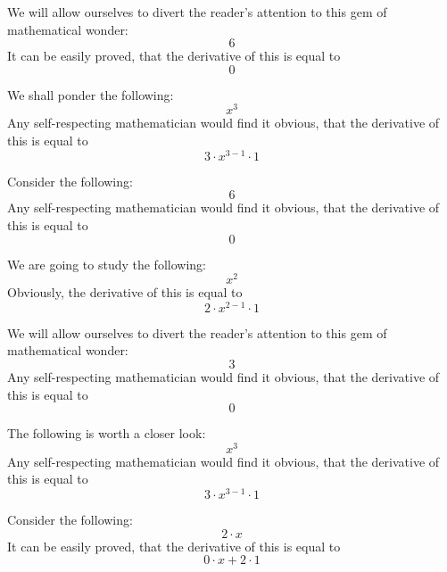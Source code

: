 \documentclass{article}
\begin{document}
We will allow ourselves to divert the reader's attention to this gem of mathematical wonder:
\begin{equation}
6 
\end{equation}
It can be easily proved, that the derivative of this is equal to
\begin{equation}
0 
\end{equation}

We shall ponder the following:
\begin{equation}
x ^{3 } 
\end{equation}
Any self-respecting mathematician would find it obvious, that the derivative of this is equal to
\begin{equation}
3 \cdot x ^{3 - 1 } \cdot 1 
\end{equation}

Consider the following:
\begin{equation}
6 
\end{equation}
Any self-respecting mathematician would find it obvious, that the derivative of this is equal to
\begin{equation}
0 
\end{equation}

We are going to study the following:
\begin{equation}
x ^{2 } 
\end{equation}
Obviously, the derivative of this is equal to
\begin{equation}
2 \cdot x ^{2 - 1 } \cdot 1 
\end{equation}

We will allow ourselves to divert the reader's attention to this gem of mathematical wonder:
\begin{equation}
3 
\end{equation}
Any self-respecting mathematician would find it obvious, that the derivative of this is equal to
\begin{equation}
0 
\end{equation}

The following is worth a closer look:
\begin{equation}
x ^{3 } 
\end{equation}
Any self-respecting mathematician would find it obvious, that the derivative of this is equal to
\begin{equation}
3 \cdot x ^{3 - 1 } \cdot 1 
\end{equation}

Consider the following:
\begin{equation}
2 \cdot x 
\end{equation}
It can be easily proved, that the derivative of this is equal to
\begin{equation}
0 \cdot x + 2 \cdot 1 
\end{equation}
\end{document}
